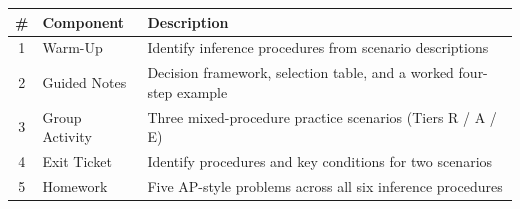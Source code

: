 \documentclass[10pt]{article}
\begin{document}
\begin{tocbox}
\small
\renewcommand{\arraystretch}{1.5}
\begin{tabularx}{\linewidth}{@{} c l X @{}}
\rowcolor{sky}
\textbf{\#} & \textbf{Component} & \textbf{Description} \\
\midrule
1 & Warm-Up        & Identify inference procedures from scenario descriptions \\
2 & Guided Notes   & Decision framework, selection table, and a worked four-step example \\
3 & Group Activity & Three mixed-procedure practice scenarios (Tiers R / A / E) \\
4 & Exit Ticket    & Identify procedures and key conditions for two scenarios \\
5 & Homework       & Five AP-style problems across all six inference procedures \\
\end{tabularx}
\end{tocbox}
\end{document}
